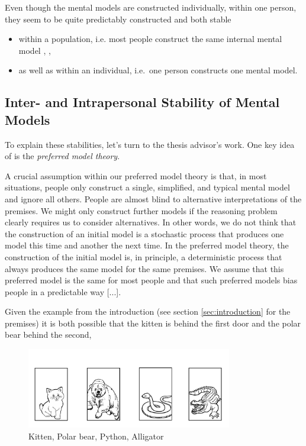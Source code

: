 \documentclass[hidelinks]{scrartcl}
\begin{document}
\noindent Even though the mental models are constructed individually, within one person, they seem to be quite predictably constructed and both stable
\begin{itemize}
\item within a population, i.e. most people construct the same internal mental model \citep{Ragni.2013}, \citep{Knauff.2013}, \citep{Rauh.2005}
\item as well as within an individual, i.e.\ one person constructs one mental model. \citep{Goodwin.2005}
\end{itemize}

\subsection{Inter- and Intrapersonal Stability of Mental Models}
To explain these stabilities, let's turn to the thesis advisor's work. One key idea of \cite{Ragni.2013} is the \textit{preferred model theory}.

\begin{displayquote}
A crucial assumption within our preferred model theory is that, in most situations, people only construct a single, simplified, and typical mental model and ignore all others. People are almost blind to alternative interpretations of the premises. We might only construct further models if the reasoning problem clearly requires us to consider alternatives. In other words, we do not think that the construction of an initial model is a stochastic process that produces one model this time and another the next time. In the preferred model theory, the construction of the initial model is, in principle, a deterministic process that always produces the same model for the same premises. We assume that this preferred model is the same for most people and that such preferred models bias people in a predictable way [...]. \\
\citep{Ragni.2013}
\end{displayquote}

Given the example from the introduction (see section \ref{sec:introduction} for the premises) it is both possible that the kitten is behind the first door and the polar bear behind the second,
\begin{figure}[H]
	\caption{Kitten, Polar bear, Python, Alligator}
	\label{fig:one_ordering}
	\centering
	\includegraphics[width=0.8\textwidth]{Illustrations/doors_animals_1.png}
\end{figure} 
\end{document}
